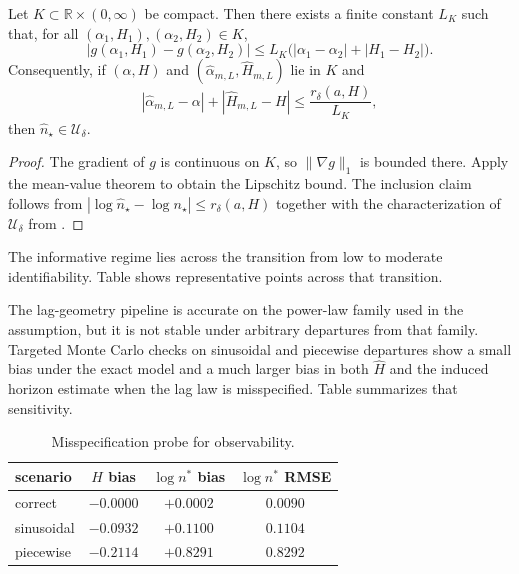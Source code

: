 \begin{proposition}
\label{prop:deterministic_horizon_stability}
Let $K\subset \mathbb R\times(0,\infty)$ be compact. Then there exists a finite
constant $L_K$ such that, for all $(\alpha_1,H_1),(\alpha_2,H_2)\in K$,
\[
  |g(\alpha_1,H_1)-g(\alpha_2,H_2)|
  \le L_K\bigl(|\alpha_1-\alpha_2|+|H_1-H_2|\bigr).
\]
Consequently, if $(\alpha,H)$ and $(\widehat\alpha_{m,L},\widehat H_{m,L})$ lie in
$K$ and
\[
  |\widehat\alpha_{m,L}-\alpha|+|\widehat H_{m,L}-H|
  \le \frac{r_\delta(a,H)}{L_K},
\]
then $\widehat n_\star\in \mathcal U_\delta$.
\end{proposition}

\begin{proof}
The gradient of $g$ is continuous on $K$, so $\|\nabla g\|_1$ is bounded there.
Apply the mean-value theorem to obtain the Lipschitz bound. The inclusion claim
follows from
$|\log \widehat n_\star-\log n_\star|\le r_\delta(a,H)$ together with the
characterization of $\mathcal U_\delta$ from .
\end{proof}

The informative regime lies across the transition from low to moderate
identifiability. Table  shows representative
points across that transition.

The lag-geometry pipeline is accurate on the power-law family used in the
assumption, but it is not stable under arbitrary departures from that family.
Targeted Monte Carlo checks on sinusoidal and piecewise departures show a small
bias under the exact model and a much larger bias in both $\widehat H$ and the
induced horizon estimate when the lag law is misspecified. Table
 summarizes that sensitivity.

\begin{table}[!htbp]
\centering
\small
\begin{tabular}{lccc}
\hline
scenario & $H$ bias & $\log n^*$ bias & $\log n^*$ RMSE \\
\hline
correct & $-0.0000$ & $+0.0002$ & $0.0090$ \\
sinusoidal & $-0.0932$ & $+0.1100$ & $0.1104$ \\
piecewise & $-0.2114$ & $+0.8291$ & $0.8292$ \\
\hline
\end{tabular}
\caption[Misspecification probe for observability]{Misspecification probe for
observability.}
\label{tab:observability_misspec}
\end{table}

